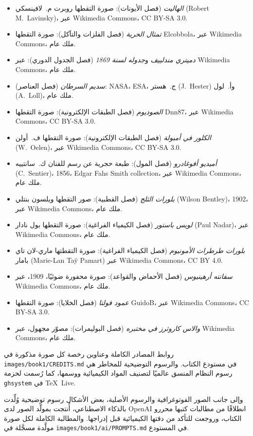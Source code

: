 \begin{itemize}
        Wikimedia Commons، ملك عام.
  \item \emph{الهاليت} (فصل الأيونات): صورة التقطها روبرت م.~لافينسكي
        (Robert M.~Lavinsky)، عبر Wikimedia Commons، CC BY-SA 3.0.
  \item \emph{تمثال الحرية} (فصل الفلزات والتآكل):
        صورة التقطها Elcobbola، عبر Wikimedia Commons، ملك عام.
  \item \emph{دميتري مندلييف} و\emph{جدوله لسنة 1869} (فصل الجدول
        الدوري): عبر Wikimedia Commons، ملك عام.
  \item \emph{سديم السرطان} (فصل العناصر): NASA، ESA، ج.~هستر
        (J.~Hester) وأ.~لول (A.~Loll)، ملك عام.
  \item \emph{الصوديوم} (فصل الطبقات الإلكترونية): صورة التقطها Dnn87، عبر
        Wikimedia Commons، CC BY-SA 3.0.
  \item \emph{الكلور في أمبولة} (فصل الطبقات الإلكترونية):
        صورة التقطها ف.~أولن (W.~Oelen)، عبر Wikimedia Commons، CC BY-SA 3.0.
  \item \emph{أميديو أفوغادرو} (فصل المول): طبعة حجرية عن
        رسم للفنان ك.~سانتييه (C.~Sentier)، 1856، Edgar Fahs Smith collection، عبر
        Wikimedia Commons، ملك عام.
  \item \emph{بلورات الثلج} (فصل القطبية): صور التقطها ويلسون
        بنتلي (Wilson Bentley)، 1902، عبر Wikimedia Commons، ملك عام.
  \item \emph{لويس باستور} (فصل الكيمياء الفراغية): صورة التقطها
        بول نادار (Paul Nadar)، عبر Wikimedia Commons، ملك عام.
  \item \emph{بلورات طرطرات الأمونيوم} (فصل الكيمياء الفراغية):
        صورة التقطتها ماري-لان تاي بامار (Marie-Lan Taÿ Pamart) عبر Wikimedia Commons،
        CC BY 4.0.
  \item \emph{سفانته أرهينيوس} (فصل الأحماض والقواعد): صورة محفورة ضوئيًا،
        1909، عبر Wikimedia Commons، ملك عام.
  \item \emph{عمود فولتا} (فصل الخلايا): صورة التقطها GuidoB، عبر
        Wikimedia Commons، CC BY-SA 3.0.
  \item \emph{والاس كاروثرز في مختبره} (فصل البوليمرات):
        مصوّر مجهول، عبر Wikimedia Commons، ملك عام.
\end{itemize}

روابط المصادر الكاملة وعناوين رخصة كل صورة مذكورة في
\texttt{images/book1/CREDITS.md} في مستودع الكتاب.
والرسوم التوضيحية للمخاطر هي رسوم النظام المنسق عالميًا لتصنيف
المواد الكيميائية ووسمها، كما رُسمت لحزمة
\texttt{ghsystem} في \TeX\ Live.

\bigskip
وإلى جانب الصور الفوتوغرافية والرسوم الأصلية، بعض الأشكال
رسوم توضيحية وُلِّدت بالذكاء الاصطناعي، أُنتجت بمولّد الصور لدى OpenAI انطلاقًا من
مطالبات كتبها محررو الكتاب، وروجعت للتأكد من دقتها الكيميائية
قبل إدراجها. والمطالبة الكاملة لكل صورة مولَّدة
مسجَّلة في \texttt{images/book1/ai/PROMPTS.md} في المستودع.
\clearpage
